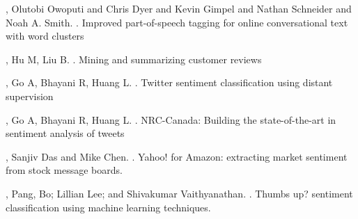 \begin{thebibliography}{}
,
Olutobi Owoputi and Chris Dyer and Kevin Gimpel and Nathan Schneider and Noah A. Smith. 
. 
\newblock Improved part-of-speech tagging for online conversational text with word clusters

,
Hu M, Liu B. 
. 
\newblock Mining and summarizing customer reviews

,
 Go A, Bhayani R, Huang L. 
. 
\newblock Twitter sentiment classification using distant supervision

,
 Go A, Bhayani R, Huang L. 
. 
\newblock NRC-Canada: Building the state-of-the-art in sentiment analysis of tweets

,
Sanjiv Das and Mike Chen.
. 
\newblock Yahoo! for Amazon: extracting market sentiment from stock message boards.

,
Pang, Bo; Lillian Lee; and Shivakumar Vaithyanathan.
. 
\newblock Thumbs up? sentiment classification using machine learning techniques. 





\end{thebibliography}











